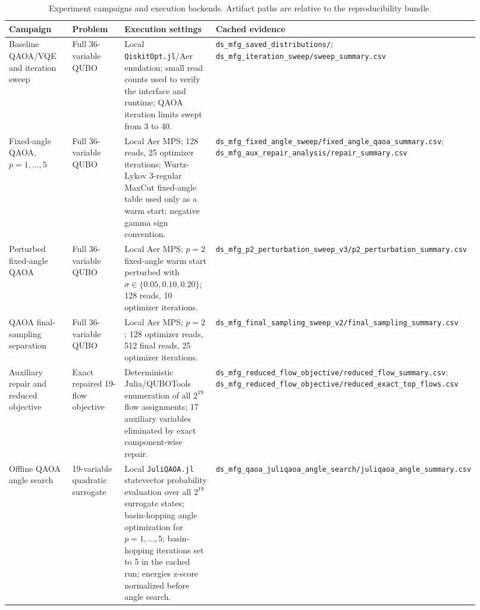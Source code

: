 \begin{table}[t]
\centering
\scriptsize
\caption{Experiment campaigns and execution backends. Artifact paths are
relative to the reproducibility bundle.}
\label{tab:ds-mfg-campaigns}
\begin{tabular}{p{0.22\linewidth}p{0.20\linewidth}p{0.28\linewidth}p{0.22\linewidth}}
\hline
Campaign & Problem & Execution settings & Cached evidence \\
\hline
Baseline QAOA/VQE and iteration sweep & Full 36-variable QUBO &
Local \texttt{QiskitOpt.jl}/Aer emulation; small read counts used to verify
the interface and runtime; QAOA iteration limits swept from 3 to 40. &
\texttt{ds\_mfg\_saved\_distributions/};
\texttt{ds\_mfg\_iteration\_sweep/sweep\_summary.csv} \\
\hline
Fixed-angle QAOA, $p=1,\ldots,5$ & Full 36-variable QUBO &
Local Aer MPS; 128 reads, 25 optimizer iterations; Wurtz-Lykov
3-regular MaxCut fixed-angle table used only as a warm start; negative gamma
sign convention. &
\texttt{ds\_mfg\_fixed\_angle\_sweep/fixed\_angle\_qaoa\_summary.csv};
\texttt{ds\_mfg\_aux\_repair\_analysis/repair\_summary.csv} \\
\hline
Perturbed fixed-angle QAOA & Full 36-variable QUBO &
Local Aer MPS; $p=2$ fixed-angle warm start perturbed with
$\sigma \in \{0.05,0.10,0.20\}$; 128 reads, 10 optimizer iterations. &
\texttt{ds\_mfg\_p2\_perturbation\_sweep\_v3/p2\_perturbation\_summary.csv} \\
\hline
QAOA final-sampling separation & Full 36-variable QUBO &
Local Aer MPS; $p=2$; 128 optimizer reads, 512 final reads, 25 optimizer
iterations. &
\texttt{ds\_mfg\_final\_sampling\_sweep\_v2/final\_sampling\_summary.csv} \\
\hline
Auxiliary repair and reduced objective & Exact repaired 19-flow objective &
Deterministic Julia/QUBOTools enumeration of all $2^{19}$ flow assignments;
17 auxiliary variables eliminated by exact component-wise repair. &
\texttt{ds\_mfg\_reduced\_flow\_objective/reduced\_flow\_summary.csv};
\texttt{ds\_mfg\_reduced\_flow\_objective/reduced\_exact\_top\_flows.csv} \\
\hline
Offline QAOA angle search & 19-variable quadratic surrogate &
Local \texttt{JuliQAOA.jl} statevector probability evaluation over all $2^{19}$
surrogate states; basin-hopping angle optimization for $p=1,\ldots,5$;
basin-hopping iterations set to 5 in the cached run; energies z-score
normalized before angle search. &
\texttt{ds\_mfg\_qaoa\_juliqaoa\_angle\_search/juliqaoa\_angle\_summary.csv} \\

\end{tabular}
\end{table}

